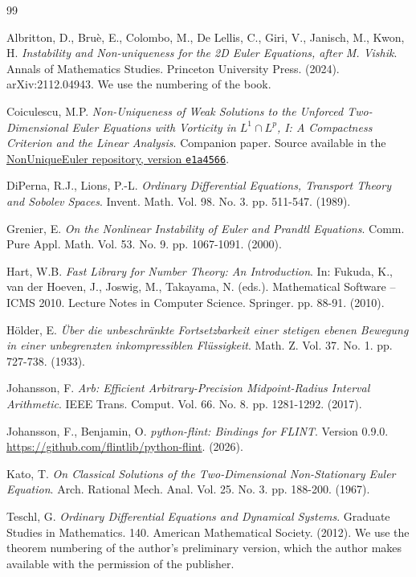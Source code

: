 \begin{thebibliography}{99}

Albritton, D., Bru\`e, E., Colombo, M., De Lellis, C., Giri, V., Janisch, M., Kwon, H.
\textit{Instability and Non-uniqueness for the 2D Euler Equations, after M. Vishik}.
Annals of Mathematics Studies. Princeton University Press. (2024).
arXiv:2112.04943. We use the numbering of the book.

Coiculescu, M.P.
\textit{Non-Uniqueness of Weak Solutions to the Unforced Two-Dimensional Euler Equations with
Vorticity in $L^1\cap L^p$, I: A Compactness Criterion and the Linear Analysis}.
Companion paper. Source available in the
\href{https://github.com/mcoiculescu/NonUniqueEuler/tree/e1a4566c894b011931de682e67e668d473e79739/manuscript/part1}
{NonUniqueEuler repository, version \texttt{e1a4566}}.

DiPerna, R.J., Lions, P.-L.
\textit{Ordinary Differential Equations, Transport Theory and Sobolev Spaces}.
Invent. Math. Vol. 98. No. 3. pp. 511-547. (1989).

Grenier, E.
\textit{On the Nonlinear Instability of Euler and Prandtl Equations}.
Comm. Pure Appl. Math. Vol. 53. No. 9. pp. 1067-1091. (2000).

Hart, W.B.
\textit{Fast Library for Number Theory: An Introduction}.
In: Fukuda, K., van der Hoeven, J., Joswig, M., Takayama, N. (eds.).
Mathematical Software -- ICMS 2010. Lecture Notes in Computer Science.
Springer. pp. 88-91. (2010).

H\"older, E.
\textit{\"Uber die unbeschr\"ankte Fortsetzbarkeit einer stetigen ebenen Bewegung in
einer unbegrenzten inkompressiblen Fl\"ussigkeit}.
Math. Z. Vol. 37. No. 1. pp. 727-738. (1933).

Johansson, F.
\textit{Arb: Efficient Arbitrary-Precision Midpoint-Radius Interval Arithmetic}.
IEEE Trans. Comput. Vol. 66. No. 8. pp. 1281-1292. (2017).

Johansson, F., Benjamin, O.
\textit{python-flint: Bindings for FLINT}. Version 0.9.0.
\url{https://github.com/flintlib/python-flint}. (2026).

Kato, T.
\textit{On Classical Solutions of the Two-Dimensional Non-Stationary Euler Equation}.
Arch. Rational Mech. Anal. Vol. 25. No. 3. pp. 188-200. (1967).

Teschl, G.
\textit{Ordinary Differential Equations and Dynamical Systems}.
Graduate Studies in Mathematics. 140. American Mathematical Society. (2012).
We use the theorem numbering of the author's preliminary version, which the
author makes available with the permission of the publisher.


\end{thebibliography}

